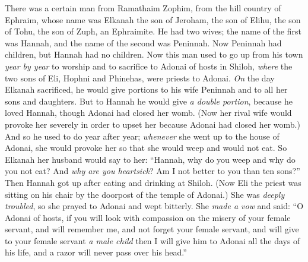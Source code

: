 
\begin{biblechapter} %
 There was a certain man from Ramathaim Zophim, from the hill country of Ephraim, whose name was Elkanah the son of Jeroham, the son of Elihu, the son of Tohu, the son of Zuph, an Ephraimite.
\verse He had two wives; the name of the first was Hannah, and the name of the second was Peninnah. Now Peninnah had children, but Hannah had no children.
\verse Now this man used to go up from his town \textit{year by year} to worship and to sacrifice to Adonai of hosts in Shiloh, \textit{where} the two sons of Eli, Hophni and Phinehas, were priests to Adonai.
\verse \textit{On} the day Elkanah sacrificed, he would give portions to his wife Peninnah and to all her sons and daughters.
\verse But to Hannah he would give \textit{a double portion}, because he loved Hannah, though Adonai had closed her womb.
\verse (Now her rival wife would provoke her severely in order to upset her because Adonai had closed her womb.)
\verse And so he used to do year after year; \textit{whenever} she went up to the house of Adonai, she would provoke her so that she would weep and would not eat.
\verse So Elkanah her husband would say to her: “Hannah, why do you weep and why do you not eat? And \textit{why are you heartsick}? Am I not better to you than ten sons?”
\verse Then Hannah got up after eating and drinking at Shiloh. (Now Eli the priest was sitting on his chair by the doorpost of the temple of Adonai.)
\verse She was \textit{deeply troubled}, so she prayed to Adonai and wept bitterly.
\verse She \textit{made a vow} and said: “O Adonai of hosts, if you will look with compassion on the misery of your female servant, and will remember me, and not forget your female servant, and will give to your female servant \textit{a male child} then I will give him to Adonai all the days of his life, and a razor will never pass over his head.”

\end{biblechapter}
